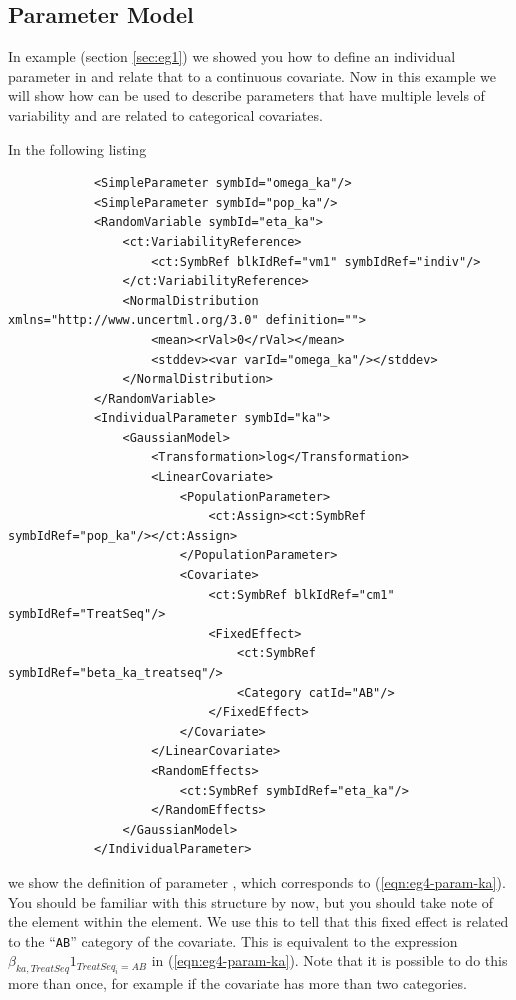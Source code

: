 \subsection{Parameter Model}

In example  (section \ref{sec:eg1}) we showed you how to define an individual
parameter in \pharmml and relate that to a continuous covariate. Now
in this example we will show how \pharmml can be used to describe
parameters that have multiple levels of variability and are related to
categorical covariates.


In the following listing 
\lstset{language=XML}
\begin{lstlisting}
            <SimpleParameter symbId="omega_ka"/>
            <SimpleParameter symbId="pop_ka"/>
            <RandomVariable symbId="eta_ka">
                <ct:VariabilityReference>
                    <ct:SymbRef blkIdRef="vm1" symbIdRef="indiv"/>
                </ct:VariabilityReference>
                <NormalDistribution xmlns="http://www.uncertml.org/3.0" definition="">
                    <mean><rVal>0</rVal></mean>
                    <stddev><var varId="omega_ka"/></stddev>
                </NormalDistribution>
            </RandomVariable>
            <IndividualParameter symbId="ka">
                <GaussianModel>
                    <Transformation>log</Transformation>
                    <LinearCovariate>
                        <PopulationParameter>
                            <ct:Assign><ct:SymbRef symbIdRef="pop_ka"/></ct:Assign>
                        </PopulationParameter>
                        <Covariate>
                            <ct:SymbRef blkIdRef="cm1" symbIdRef="TreatSeq"/>
                            <FixedEffect>
                                <ct:SymbRef symbIdRef="beta_ka_treatseq"/>
                                <Category catId="AB"/>
                            </FixedEffect>
                        </Covariate>
                    </LinearCovariate>
                    <RandomEffects>
                        <ct:SymbRef symbIdRef="eta_ka"/>
                    </RandomEffects>
                </GaussianModel>
            </IndividualParameter>
\end{lstlisting}

 we show the definition of
parameter , which corresponds to (\ref{eqn:eg4-param-ka}). You
should be familiar with this structure by now, but you should take
note of the  element within the 
element. We use this to tell \pharmml that this fixed effect is related
to the ``\texttt{AB}'' category of the  covariate. This
is equivalent to the expression
$\beta_{ka,TreatSeq}1_{TreatSeq_i=AB}$ in
(\ref{eqn:eg4-param-ka}). Note that it is possible to do this more
than once, for example if the covariate has more than two categories.


